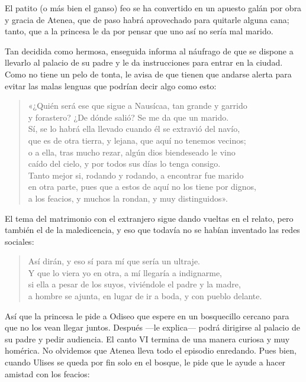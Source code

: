 El patito (o más bien el ganso) feo se ha convertido en un apuesto galán por obra y gracia de Atenea, que de paso habrá aprovechado para quitarle alguna cana; tanto, que a la princesa le da por pensar que uno así no sería mal marido.

Tan decidida como hermosa, enseguida informa al náufrago de que se dispone a llevarlo al palacio de su padre y le da instrucciones para entrar en la ciudad. Como no tiene un pelo de tonta, le avisa de que tienen que andarse alerta para evitar las malas lenguas que podrían decir algo como esto:

\begin{verse}
«¿Quién será ese que sigue a Nausícaa, tan grande y garrido\\
y forastero? ¿De dónde salió? Se me da que un marido.\\
Sí, se lo habrá ella llevado cuando él se extravió del navío,\\
que es de otra tierra, y lejana, que aquí no tenemos vecinos;\\
o a ella, tras mucho rezar, algún dios biendeseado le vino\\
caído del cielo, y por todos sus días lo tenga consigo.\\
Tanto mejor si, rodando y rodando, a encontrar fue marido\\
en otra parte, pues que a estos de aquí no los tiene por dignos,\\
a los feacios, y muchos la rondan, y muy distinguidos».
\end{verse}


El tema del matrimonio con el extranjero sigue dando vueltas en el relato, pero también el de la maledicencia, y eso que todavía no se habían inventado las redes sociales:

\begin{verse}
Así dirán, y eso sí para mí que sería un ultraje.\\
Y que lo viera yo en otra, a mí llegaría a indignarme,\\
si ella a pesar de los suyos, viviéndole el padre y la madre,\\
a hombre se ajunta, en lugar de ir a boda, y con pueblo delante.
\end{verse}

Así que la princesa le pide a Odiseo que espere en un bosquecillo cercano para que no los vean llegar juntos. Después ---le explica--- podrá dirigirse al palacio de su padre y pedir audiencia. El canto VI termina de una manera curiosa y muy homérica. No olvidemos que Atenea lleva todo el episodio enredando. Pues bien, cuando Ulises se queda por fin solo en el bosque, le pide que le ayude a hacer amistad con los feacios:

